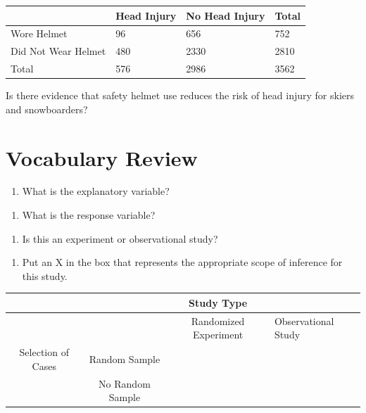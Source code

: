 \documentclass[
]{report}
\providecommand{\tightlist}{%
  \setlength{\itemsep}{0pt}\setlength{\parskip}{0pt}}
\begin{document}
\begin{longtable}[]{@{}llll@{}}
\toprule
& Head Injury & No Head Injury & Total\tabularnewline
\midrule
\endhead
Wore Helmet & 96 & 656 & 752\tabularnewline
Did Not Wear Helmet & 480 & 2330 & 2810\tabularnewline
Total & 576 & 2986 & 3562\tabularnewline
\bottomrule
\end{longtable}

Is there evidence that safety helmet use reduces the risk of head injury for skiers and snowboarders?

\hypertarget{vocabulary-review}{%
\section{Vocabulary Review}\label{vocabulary-review}}

\begin{enumerate}
\def\labelenumi{\arabic{enumi}.}
\tightlist
\item
  What is the explanatory variable?
\end{enumerate}

\vspace{0.5in}

\begin{enumerate}
\def\labelenumi{\arabic{enumi}.}
\setcounter{enumi}{1}
\tightlist
\item
  What is the response variable?
\end{enumerate}

\vspace{0.5in}

\begin{enumerate}
\def\labelenumi{\arabic{enumi}.}
\setcounter{enumi}{2}
\tightlist
\item
  Is this an experiment or observational study?
\end{enumerate}

\vspace{0.5in}

\begin{enumerate}
\def\labelenumi{\arabic{enumi}.}
\setcounter{enumi}{3}
\tightlist
\item
  Put an X in the box that represents the appropriate scope of inference for this study.
\end{enumerate}

\begin{longtable}[]{@{}cccl@{}}
\toprule
& & Study Type &\tabularnewline
\midrule
\endhead
& & Randomized Experiment & Observational Study\tabularnewline
Selection of Cases & Random Sample & &\tabularnewline
& No Random Sample & &\tabularnewline
\bottomrule
\end{longtable}
\end{document}
